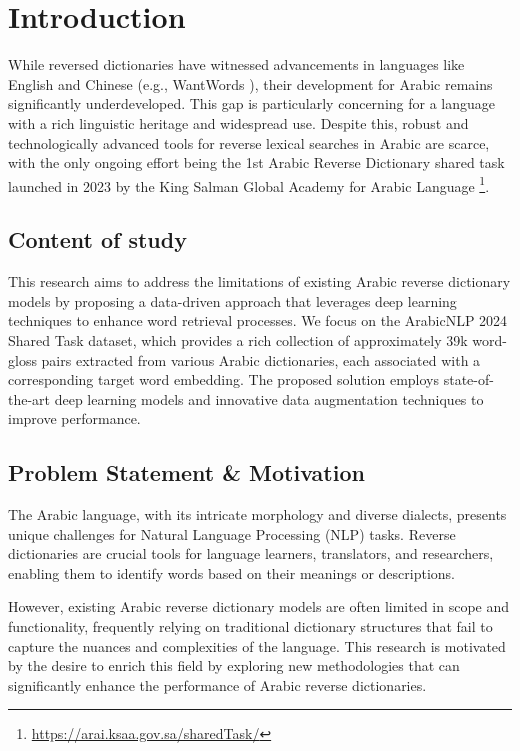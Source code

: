 \documentclass[12.5pt]{article}
\begin{document}
\section{Introduction}

While reversed dictionaries have witnessed advancements in languages like English and Chinese (e.g., WantWords \cite{Qi2020}), their development for Arabic remains significantly underdeveloped. This gap is particularly concerning for a language with a rich linguistic heritage and widespread use. Despite this, robust and technologically advanced tools for reverse lexical searches in Arabic are scarce, with the only ongoing effort being the 1st Arabic Reverse Dictionary shared task launched in 2023 by the King Salman Global Academy for Arabic Language \footnote{\url{https://arai.ksaa.gov.sa/sharedTask/}}.


\subsection{Content of study}

This research aims to address the limitations of existing Arabic reverse dictionary models by proposing a data-driven approach that leverages deep learning techniques to enhance word retrieval processes. We focus on the ArabicNLP 2024 Shared Task dataset, which provides a rich collection of approximately 39k word-gloss pairs extracted from various Arabic dictionaries, each associated with a corresponding target word embedding. The proposed solution employs state-of-the-art deep learning models and innovative data augmentation techniques to improve performance.

\subsection{Problem Statement \& Motivation}

The Arabic language, with its intricate morphology and diverse dialects, presents unique challenges for Natural Language Processing (NLP) tasks. Reverse dictionaries are crucial tools for language learners, translators, and researchers, enabling them to identify words based on their meanings or descriptions.

However, existing Arabic reverse dictionary models are often limited in scope and functionality, frequently relying on traditional dictionary structures that fail to capture the nuances and complexities of the language. This research is motivated by the desire to enrich this field by exploring new methodologies that can significantly enhance the performance of Arabic reverse dictionaries.
\end{document}
